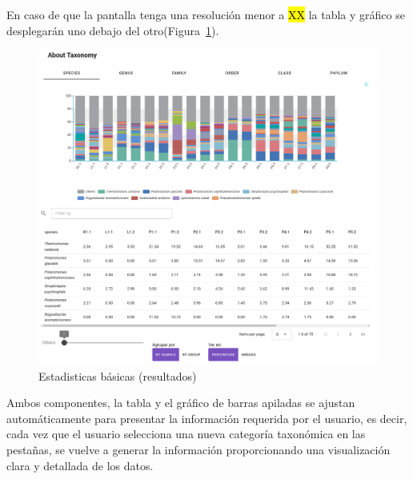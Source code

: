En caso de que la pantalla tenga una resolución menor a \hl{XX} la tabla y gráfico se desplegarán uno debajo del otro(Figura~\ref{fig:app-results-taxonomy-small-dev}).
\begin{figure}[H]
    \centering
    \includegraphics[width=0.8\linewidth]{images/app/results/taxonomy_small_dev.png}

    \caption{Estadisticas básicas (resultados)}
    \label{fig:app-results-taxonomy-small-dev}
\end{figure}

Ambos componentes, la tabla y el gráfico de barras apiladas se ajustan automáticamente para presentar la información requerida por el usuario, es decir, cada vez que el usuario selecciona una nueva categoría taxonómica en las pestañas, se vuelve a generar la información proporcionando una visualización clara y detallada de los datos.







